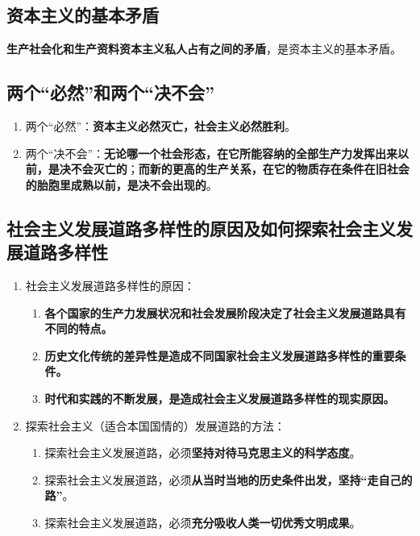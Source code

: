 \documentclass[12pt, a4paper, oneside]{ctexbook}
\begin{document}
\subsection{资本主义的基本矛盾}

\textbf{生产社会化和生产资料资本主义私人占有之间的矛盾}，是资本主义的基本矛盾。

\subsection{两个“必然”和两个“决不会”}

\begin{enumerate}
\item 两个“必然”：\textbf{资本主义必然灭亡，社会主义必然胜利}。
\item 两个“决不会”：\textbf{无论哪一个社会形态，在它所能容纳的全部生产力发挥出来以前，是决不会灭亡的}；\textbf{而新的更高的生产关系，在它的物质存在条件在旧社会的胎胞里成熟以前，是决不会出现的}。
\end{enumerate}

\subsection{社会主义发展道路多样性的原因及如何探索社会主义发展道路多样性}

\begin{enumerate}
\item 社会主义发展道路多样性的原因：
\begin{enumerate}
\item \textbf{各个国家的生产力发展状况和社会发展阶段决定了社会主义发展道路具有不同的特点。}
\item \textbf{历史文化传统的差异性是造成不同国家社会主义发展道路多样性的重要条件。}
\item \textbf{时代和实践的不断发展，是造成社会主义发展道路多样性的现实原因。}
\end{enumerate}
\item 探索社会主义（适合本国国情的）发展道路的方法：
\begin{enumerate}
\item 探索社会主义发展道路，必须\textbf{坚持对待马克思主义的科学态度}。
\item 探索社会主义发展道路，必须\textbf{从当时当地的历史条件出发，坚持“走自己的路”}。
\item 探索社会主义发展道路，必须\textbf{充分吸收人类一切优秀文明成果}。
\end{enumerate}
\end{enumerate}
\end{document}
